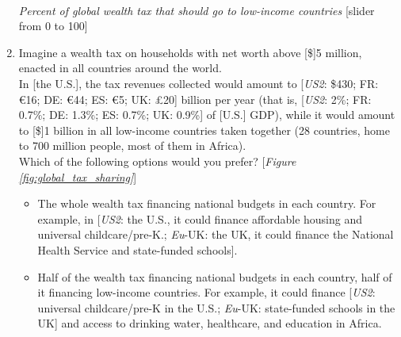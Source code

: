 \begin{enumerate}[resume]
  \\ \textit{Percent of global wealth tax that should go to low-income countries} [slider from 0 to 100]
  \item \label{q:global_tax_sharing} Imagine a wealth tax on households with net worth above [\$]5 million, enacted in all countries around the world.  \\
  In [the U.S.], the tax revenues collected would amount to [\textit{US2}: \$430; FR: \euro{}16; DE: \euro{}44; ES: \euro{}5; UK: £20] billion per year (that is, [\textit{US2}: 2\%; FR: 0.7\%; DE: 1.3\%; ES: 0.7\%; UK: 0.9\%] of [U.S.] GDP), while it would amount to [\$]1 billion in all low-income countries taken together (28 countries, home to 700 million people, most of them in Africa).  \\ Which of the following options would you prefer?  [\textit{Figure \ref{fig:global_tax_sharing}}]
  \begin{itemize}
    \item The whole wealth tax financing national budgets in each country. For example, in [\textit{US2}: the U.S., it could finance affordable housing and universal childcare/pre-K.; \textit{Eu}-UK: the UK, it could finance the National Health Service and state-funded schools].
    \item Half of the wealth tax financing national budgets in each country, half of it financing low-income countries. For example, it could finance [\textit{US2}: universal childcare/pre-K in the U.S.; \textit{Eu}-UK: state-funded schools in the UK] and access to drinking water, healthcare, and education in Africa. 
  \end{itemize}
\end{enumerate}

